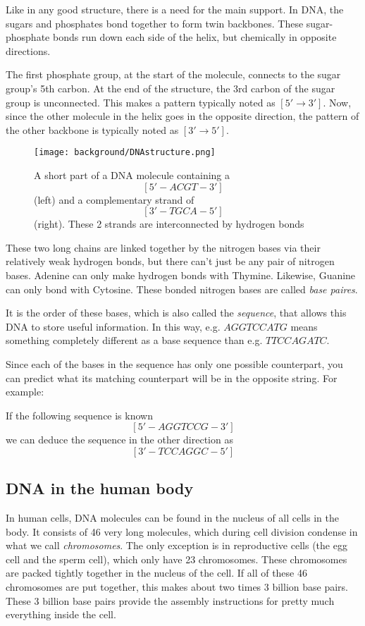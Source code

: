Like in any good structure, there is a need for the main support. In DNA, the sugars and phosphates bond together to form twin backbones. These sugar-phosphate bonds run down each side of the helix, but chemically in opposite directions. 

The first phosphate group, at the start of the molecule, connects to the sugar group's 5th carbon. At the end of the structure, the 3rd carbon of the sugar group is unconnected. This makes a pattern typically noted as $[5' \rightarrow 3']$. Now, since the other molecule in the helix goes in the opposite direction, the pattern of the other backbone is typically noted as $[3' \rightarrow 5']$.

\begin{figure}[H]
	\centering
	\texttt{[image: background/DNAstructure.png]}
	\caption{A short part of a DNA molecule containing a $$[5' - ACGT - 3']$$ (left) and a complementary strand of $$[3' - TGCA - 5']$$ (right). These 2 strands are interconnected by hydrogen bonds}
	\label{fig:DNAstructure}
\end{figure}

These two long chains are linked together by the nitrogen bases via their relatively weak hydrogen bonds, but there can't just be any pair of nitrogen bases. Adenine can only make hydrogen bonds with Thymine. Likewise, Guanine can only bond with Cytosine. These bonded nitrogen bases are called \emph{base paires}.

It is the order of these bases, which is also called the \emph{sequence}, that allows this DNA to store useful information. In this way, e.g. $AGGTCCATG$ means something completely different as a base sequence than e.g. $TTCCAGATC$.

Since each of the bases in the sequence has only one possible counterpart, you can predict what its matching counterpart will be in the opposite string. For example:

If the following sequence is known
$$[5' - AGGTCCG - 3']$$
we can deduce the sequence in the other direction as
$$[3' - TCCAGGC - 5']$$

\subsection{DNA in the human body}

In human cells, DNA molecules can be found in the nucleus of all cells in the body. It consists of 46 very long molecules, which during cell division condense in what we call \emph{chromosomes}. The only exception is in reproductive cells (the egg cell and the sperm cell), which only have 23 chromosomes. These chromosomes are packed tightly together in the nucleus of the cell. If all of these 46 chromosomes are put together, this makes about two times 3 billion base pairs. These 3 billion base pairs provide the assembly instructions for pretty much everything inside the cell.

